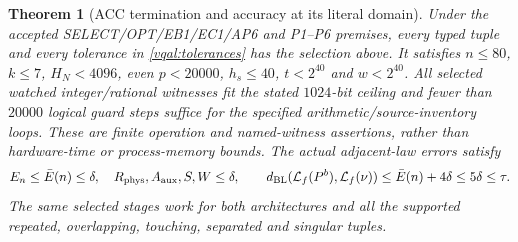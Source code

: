 \documentclass[11pt]{article}
\theoremstyle{plain}
\newtheorem{theorem}{Theorem}[section]
\theoremstyle{definition}
\theoremstyle{remark}
\begin{document}
\begin{theorem}[ACC termination and accuracy at its literal domain]
\label{vqal:acc}
Under the accepted SELECT/OPT/EB1/EC1/AP6 and P1--P6 premises, every
typed tuple and every tolerance in \eqref{vqal:tolerances} has the
selection above. It satisfies $n\le80$, $k\le7$, $H_N<4096$,
even $p<20000$, $h_s\le40$, $t<2^{40}$ and $w<2^{40}$.
All selected watched integer/rational witnesses fit the stated
$1024$-bit ceiling and fewer than $20000$ logical guard steps suffice
for the specified arithmetic/source-inventory loops. These are finite
operation and named-witness assertions, rather than hardware-time or
process-memory bounds. The actual adjacent-law errors satisfy
\begin{equation}\label{vqal:acc-result}
 E_n\le\bar E(n)\le\delta,\quad
 R_{\rm phys},A_{\rm aux},S,W\le\delta,\qquad
 d_{\rm BL}(\mathcal L_f(P^b),\mathcal L_f(\nu))
       \le\bar E(n)+4\delta\le5\delta\le\tau.
\end{equation}
The same selected stages work for both architectures and all the
supported repeated, overlapping, touching, separated and singular tuples.
\end{theorem}
\end{document}
